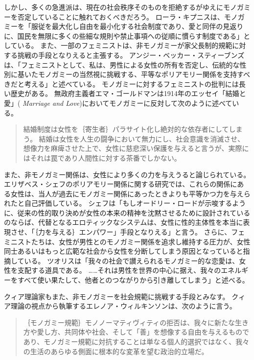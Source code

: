 \documentclass[paper=a4,book,openany]{jlreq}
\newcommand{\ig}[1]{}           %
\begin{document}
しかし、多くの急進派は、現在の社会秩序そのものを拒絶するがゆえにモノガミーを否定していることに触れておくべきだろう。
ローラ・キプニスは、モノガミーを「服従を最大化し自由を最小化する社会制度であり、愛と同伴の見返りに、国民を無限に多くの些細な規則や禁止事項への従順に慣らす制度である」としている\citep{kipnis03:_troub_marriag}。
また、一部のフェミニストは、非モノガミーが家父長制的規範に対する挑戦の手段となりえると主張する。
アンジー・ベッカー・スティーブンズは、「フェミニストとして、私は、男性による女性の所有を否定し、伝統的な性別に基いたモノガミーの当然視に挑戦する、平等なポリアモリー関係を支持すべきだと考える」と述べている\citep{stevens13:_shoul_femin_be_critic_compul_monog}。
モノガミーに対するフェミニストの批判には長い歴史がある。
無政府主義者エマ・ゴールドマンは1914年のエッセイ「結婚と愛」( \emph{Marriage and Love})においてモノガミーに反対して次のように述べている。

\begin{quote}
結婚制度は女性を｛寄生者｝{パラサイト}化し絶対的な依存者にしてしまう。
結婚は女性を人生の闘争において無力にし、社会意識を消滅させ、想像力を麻痺させた上で、女性に慈悲深い保護を与えると言うが、実際にはそれは罠であり人間性に対する茶番でしかない。
\citep{goldman14:_marriag_love}\ig{Emma Goldman}
\end{quote}

また、非モノガミー関係は、女性により多くの力を与えうると論じられている。
エリザベス・シェフのポリアモリー関係に関する研究では、これらの関係にある女性は、当人が過去にモノガミー関係にあったときよりも平等かつ力を与えられたと自己評価している。
シェフは「もしオードリー・ロードが示唆するように、従来の性的取り決めが女性の本来の精神を沈黙させるために設計されているのならば、代替となるエロティックなシステムは、女性に性的主体性を本当に表現させ、「｛力を与える｝{エンパワー}」手段となりえる」と言う\citep[p.6]{sheff05:_polyam_women_sexual_subjec_power}。
さらに、フェミニストたちは、女性が男性とのモノガミー関係を追求し維持する圧力が、女性同士あるいはもっと広範な社会から女性を分断してしまう原因となっていると指摘している\citep{rosa94:_anti}。
ツオリスは「我々の社会で讃えられるモノガミー的な恋愛は、女性を支配する道具である。
……それは男性を世界の中心に据え、我々のエネルギーをすべて使い果たして、他者とのつながりから引き離してしまう」と述べる\citep[p.25]{tsoulis87:_heter}。

クィア理論家もまた、非モノガミーを社会規範に挑戦する手段とみなす。
クィア理論の視点から執筆するエレノア・ウィルキンソンは、次のように言う。

\begin{quote}

  ｛モノガミー規範｝{モノノーマティヴィティ}の拒否は、我々に新たな生き方や愛し方、共同体や社会、そして「善」を想像する自由を与えるものであり、モノガミー規範に対抗することは単なる個人的選択ではなく、我々の生活のあらゆる側面に根本的な変革を望む政治的立場だ。
\citep[p.344]{wilkinson10:_whats_queer_non_monog_now}

\end{quote}
\end{document}
